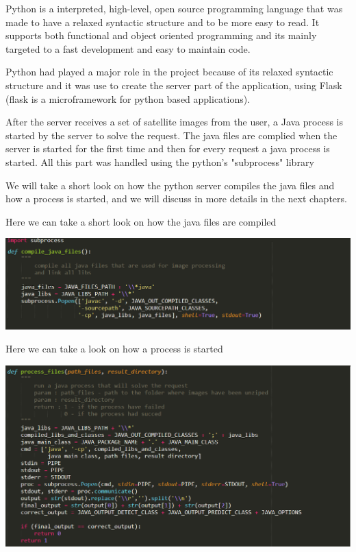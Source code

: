 \documentclass[12pt, a4paper]{report}
\begin{document}
Python is a interpreted, high-level, open source programming language that was made to have a  relaxed syntactic structure and to be more easy to read. It supports both functional and object oriented programming and its mainly targeted to a fast development and easy to maintain code.
\par

Python had played a major role in the project because of its relaxed syntactic structure and it was use to create the server part of the application, using Flask (flask is a microframework for python based applications).
\par 

After the server receives a set of satellite images from the user, a Java process is started by the server to solve the request. The java files are complied when the server is started for the first time and then for every request a java process is started. All this part was handled using the python's "subprocess" library
\par
\medskip

We will take a short look on how the python server compiles the java files and how a process is started, and we will discuss in more details in the next chapters.
\medskip

Here we can take a short look on how the java files are compiled
\par
\medskip
\includegraphics[scale=0.6]{python_call_java_1.png}
\bigskip

Here we can take a look on how a process is started
\par
\medskip
\includegraphics[scale=0.6]{python_call_java_2.png}
\end{document}
